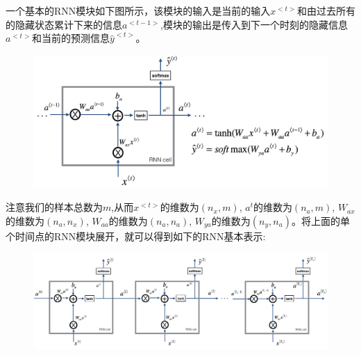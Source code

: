 \documentclass{ctexart}
\begin{document}
一个基本的RNN模块如下图所示，该模块的输入是当前的输入$x^{<t>}$和由过去所有的隐藏状态累计下来的信息$a^{<t-1>}$,模块的输出是传入到下一个时刻的隐藏信息$a^{<t>}$和当前的预测信息$\hat{y}^{<t>}$。
\begin{figure}[htb!]
	\centering
	\includegraphics[scale=0.4]{rnn_step_forward.png}
\end{figure}
注意我们的样本总数为$m$,从而$x^{<t>}$的维数为$(n_x,m)$, $a^{t}$的维数为$(n_a,m)$, $W_{ax}$的维数为$(n_a,n_x)$, $W_{aa}$的维数为$(n_a,n_a)$, $W_{ya}$的维数为$(n_y,n_a)$。将上面的单个时间点的RNN模块展开，就可以得到如下的RNN基本表示:
\begin{figure}[htb!]
	\centering
	\includegraphics[scale=0.55]{rnn.png}
\end{figure}
\end{document}
